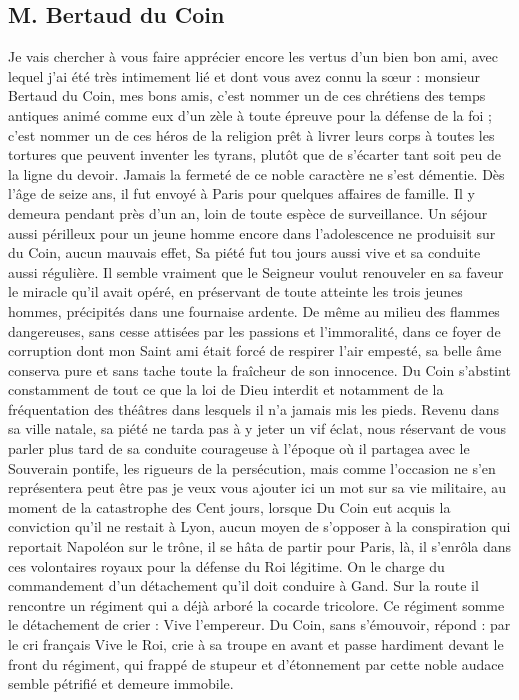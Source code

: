 \documentclass[11pt,a4paper]{report}
\begin{document}
\subsection*{M. Bertaud du Coin}

Je vais chercher à vous faire apprécier encore les vertus d'un bien bon ami, avec lequel j'ai été très intimement lié et dont vous avez connu la sœur : monsieur Bertaud du Coin, mes bons amis, c'est nommer un de ces chrétiens des temps antiques animé comme eux d'un zèle à toute épreuve pour la défense de la foi ; c'est nommer un de ces héros de la religion prêt à livrer leurs corps à toutes les tortures que peuvent inventer les tyrans, plutôt que de s'écarter tant soit peu de la ligne du devoir. Jamais la fermeté de ce noble caractère ne s'est démentie. Dès l'âge de seize ans, il fut envoyé à Paris pour quelques affaires de famille. Il y demeura pendant près d'un an, loin de toute espèce de surveillance. Un séjour aussi périlleux pour un jeune homme encore dans l'adolescence ne produisit sur du Coin, aucun mauvais effet, Sa piété fut tou jours aussi vive et sa conduite aussi régulière. Il semble vraiment que le Seigneur voulut renouveler en sa faveur le miracle qu'il avait opéré, en préservant de toute atteinte les trois jeunes hommes, précipités dans une fournaise ardente. De même au milieu des flammes dangereuses, sans cesse attisées par les passions et l'immoralité, dans ce foyer de corruption dont mon Saint ami était forcé de respirer l'air empesté, sa belle âme conserva pure et sans tache toute la fraîcheur de son innocence. Du Coin s'abstint constamment de tout ce que la loi de Dieu interdit et notamment de la fréquentation des théâtres dans lesquels il n'a jamais mis les pieds. Revenu dans sa ville natale, sa piété ne tarda pas à y jeter un vif éclat, nous réservant de vous parler plus tard de sa conduite courageuse à l'époque où il partagea avec le Souverain pontife, les rigueurs de la persécution, mais comme l'occasion ne s'en représentera peut être pas je veux vous ajouter ici un mot sur sa vie militaire, au moment de la catastrophe des Cent jours, lorsque Du Coin eut acquis la conviction qu'il ne restait à Lyon, aucun moyen de s'opposer à la conspiration qui reportait Napoléon sur le trône, il se hâta de partir pour Paris, là, il s'enrôla dans ces volontaires royaux pour la défense du Roi légitime. On le charge du commandement d'un détachement qu'il doit conduire à Gand. Sur la route il rencontre un régiment qui a déjà arboré la cocarde tricolore. Ce régiment somme le détachement de crier : Vive l'empereur. Du Coin, sans s'émouvoir, répond : par le cri français Vive le Roi, crie à sa troupe en avant et passe hardiment devant le front du régiment, qui frappé de stupeur et d'étonnement par cette noble audace semble pétrifié et demeure immobile.
\end{document}
